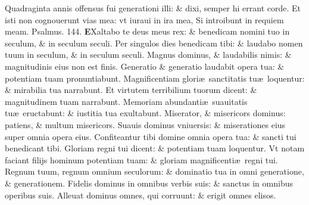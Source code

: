 \documentclass[a5paper,10pt]{book}
\def\ae{æ}
\begin{document}
\begin{multicols*}{2}
\newline \color{red} Q\color{black}uadraginta annis offensus fui generationi illi: \& dixi, semper hi errant corde.
\newline \color{red} E\color{black}t isti non cognouerunt vias mea: vt iuraui in ira mea, Si introibunt in requiem meam.%
\quad \color{red} Psalmus. 144.\color{black}
\lettrine[lines=2]{\bfseries \color{red} E}{}Xaltabo te deus meus rex: \& benedicam nomini tuo in seculum, \& in seculum seculi.
\newline \color{red} P\color{black}er singulos dies benedicam tibi: \& laudabo nomen tuum in seculum, \& in seculum seculi.
\newline \color{red} M\color{black}agnus dominus, \& laudabilis nimis: \& magnitudinis eius non est finis.
\newline \color{red} G\color{black}eneratio \& generatio laudabit opera tua: \& potentiam tuam pronuntiabunt.
\newline \color{red} M\color{black}agnificentiam glori\ae \ sanctitatis tu\ae \ loquentur: \& mirabilia tua narrabunt.
\newline \color{red} E\color{black}t virtutem terribilium tuorum dicent: \& magnitudinem tuam narrabunt.
\newline \color{red} M\color{black}emoriam abundanti\ae \ suauitatis tu\ae \ eructabunt: \& iustitia tua exultabunt.
\newline \color{red} M\color{black}iserator, \& misericors dominus: patiens, \& multum misericors.
\newline \color{red} S\color{black}uauis dominus vniuersis: \& miserationes eius super omnia opera eius.
\newline \color{red} C\color{black}onfiteantur tibi domine omnia opera tua: \& sancti tui benedicant tibi.
\newline \color{red} G\color{black}loriam regni tui dicent: \& potentiam tuam loquentur.
\newline \color{red} V\color{black}t notam faciant filijs hominum potentiam tuam: \& gloriam magnificenti\ae \ regni tui.
\newline \color{red} R\color{black}egnum tuum, regnum omnium seculorum: \& dominatio tua in omni generatione, \& generationem.
\newline \color{red} F\color{black}idelis dominus in omnibus verbis suis: \& sanctus in omnibus operibus suis.
\newline \color{red} A\color{black}lleuat dominus omnes, qui corruunt: \& erigit omnes elisos.

\end{multicols*}
\end{document}
